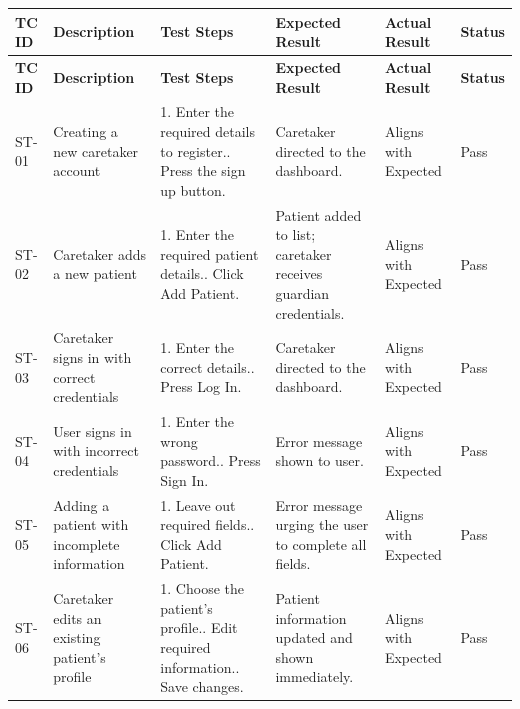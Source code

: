 \documentclass[12pt,a4paper]{article}
\begin{document}
\begin{longtable}{|p{1cm}|p{2.5cm}|p{3.5cm}|p{3.5cm}|p{2cm}|p{1.2cm}|}
    \hline
    \textbf{TC ID} & \textbf{Description} & \textbf{Test Steps} & \textbf{Expected Result} & \textbf{Actual Result} & \textbf{Status} \\
    \hline
    \endfirsthead
    \hline
    \textbf{TC ID} & \textbf{Description} & \textbf{Test Steps} & \textbf{Expected Result} & \textbf{Actual Result} & \textbf{Status} \\
    \hline
    \endhead
 
    ST-01 & Creating a new caretaker account &
        1. Enter the required details to register.\newline
        2. Press the sign up button. &
        Caretaker directed to the dashboard. &
        Aligns with Expected & Pass \\
    \hline
 
    ST-02 & Caretaker adds a new patient &
        1. Enter the required patient details.\newline
        2. Click Add Patient. &
        Patient added to list; caretaker receives guardian credentials. &
        Aligns with Expected & Pass \\
    \hline
 
    ST-03 & Caretaker signs in with correct credentials &
        1. Enter the correct details.\newline
        2. Press Log In. &
        Caretaker directed to the dashboard. &
        Aligns with Expected & Pass \\
    \hline
 
    ST-04 & User signs in with incorrect credentials &
        1. Enter the wrong password.\newline
        2. Press Sign In. &
        Error message shown to user. &
        Aligns with Expected & Pass \\
    \hline
 
    ST-05 & Adding a patient with incomplete information &
        1. Leave out required fields.\newline
        2. Click Add Patient. &
        Error message urging the user to complete all fields. &
        Aligns with Expected & Pass \\
    \hline
 
    ST-06 & Caretaker edits an existing patient's profile &
        1. Choose the patient's profile.\newline
        2. Edit required information.\newline
        3. Save changes. &
        Patient information updated and shown immediately. &
        Aligns with Expected & Pass \\
    \hline
 

\end{longtable}
\end{document}
